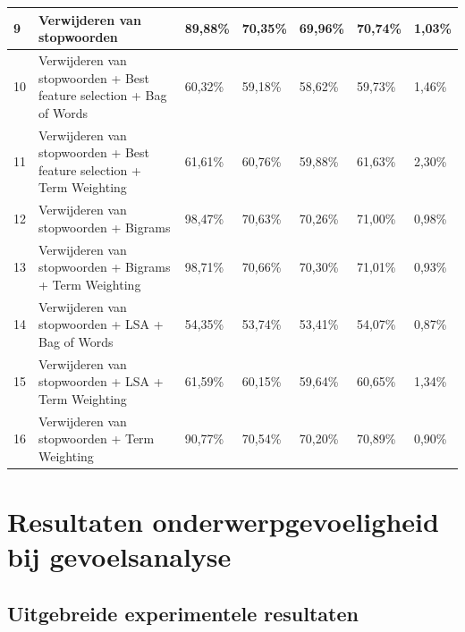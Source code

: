 \begin{table}
\begin{adjustbox}{width=1\textwidth}
\begin{tabular}{|l|l|l|l|l|l|l|}
9        & Verwijderen van stopwoorden                                                      & 89,88\%                     & 70,35\%                & 69,96\%                 & 70,74\%                  & 1,03\%      \\ \hline
10       & Verwijderen van stopwoorden + Best feature selection + Bag of Words   & 60,32\%                     & 59,18\%                & 58,62\%                 & 59,73\%                  & 1,46\%      \\ \hline
11       & Verwijderen van stopwoorden + Best feature selection + Term Weighting & 61,61\%                     & 60,76\%                & 59,88\%                 & 61,63\%                  & 2,30\%      \\ \hline
12       & Verwijderen van stopwoorden + Bigrams                                            & 98,47\%                     & 70,63\%                & 70,26\%                 & 71,00\%                  & 0,98\%      \\ \hline
13       & Verwijderen van stopwoorden + Bigrams + Term Weighting                           & 98,71\%                     & 70,66\%                & 70,30\%                 & 71,01\%                  & 0,93\%      \\ \hline
14       & Verwijderen van stopwoorden + LSA + Bag of Words                                 & 54,35\%                     & 53,74\%                & 53,41\%                 & 54,07\%                  & 0,87\%      \\ \hline
15       & Verwijderen van stopwoorden + LSA + Term Weighting                               & 61,59\%                     & 60,15\%                & 59,64\%                 & 60,65\%                  & 1,34\%      \\ \hline
16       & Verwijderen van stopwoorden + Term Weighting                                     & 90,77\%                     & 70,54\%                & 70,20\%                 & 70,89\%                  & 0,90\%      \\ \hline
\end{tabular}
\end{adjustbox}
\end{table}


\chapter{Resultaten onderwerpgevoeligheid bij gevoelsanalyse}\label{bijlage onderwerp}

\section{Uitgebreide experimentele resultaten}

